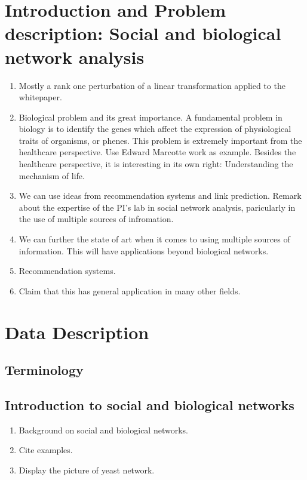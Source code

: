 \documentclass[11pt]{article}
\begin{document}

\newpage
\section{Introduction and Problem description: Social and biological network analysis}
\begin{enumerate}
 \item Mostly a rank one perturbation of a linear transformation applied to the whitepaper.
 \item Biological problem and its great importance.
 \subitem A fundamental problem in biology is to identify the genes which affect the expression of physiological traits of organisms, or phenes. This problem is extremely important from the healthcare perspective. 
Use Edward Marcotte work as example.
 \subitem Besides the healthcare perspective, it is interesting in its own right: Understanding the mechanism of life.
 \item {} We can use ideas from recommendation systems and link prediction.
 \subitem Remark about the expertise of the PI's lab in social network analysis, paricularly in the use of multiple sources of infromation.
 \item We can further the state of art when it comes to using multiple sources of information. This will have applications beyond biological networks.
 \item {} Recommendation systems.
 \item Claim that this has general application in many other fields.
\end{enumerate}


\section{Data Description}
\subsection{Terminology}

\subsection{Introduction to social and biological networks}
\begin{enumerate}
\item Background on social and biological networks. 
\item Cite examples.
\item Display the picture of yeast network.
\end{enumerate}
\end{document}
